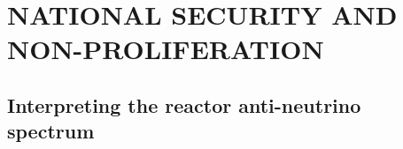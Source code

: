 \documentclass[letterpaper]{ar-1col}
\begin{document}



\section{NATIONAL SECURITY AND NON-PROLIFERATION}



\subsection{Interpreting the reactor anti-neutrino spectrum}
\end{document}
